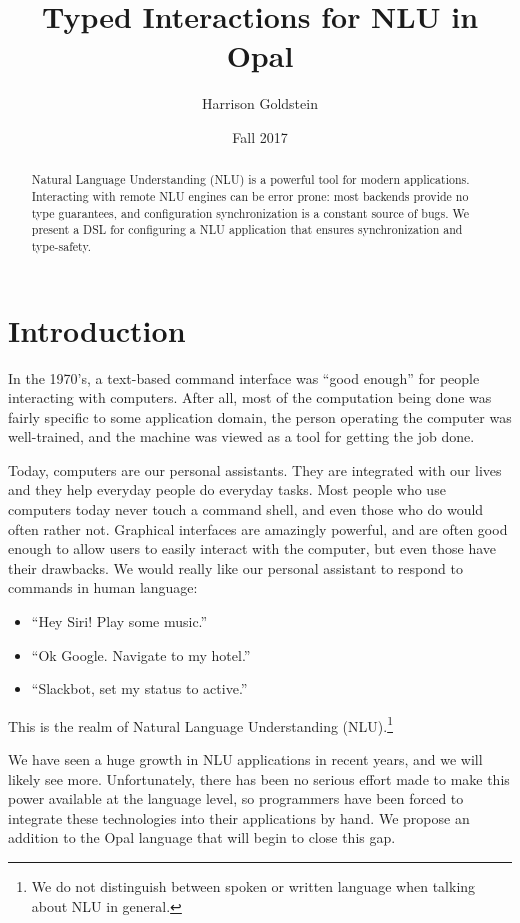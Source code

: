 \documentclass[twocolumn]{article}
\title{Typed Interactions for NLU in Opal}
\author{Harrison Goldstein}
\date{Fall 2017}
\begin{document}
\maketitle

\begin{abstract}
  Natural Language Understanding (NLU) is a powerful tool for modern
  applications. Interacting with remote NLU engines can be error prone: most
  backends provide no type guarantees, and configuration synchronization is a
  constant source of bugs. We present a DSL for configuring a NLU application
  that ensures synchronization and type-safety.
\end{abstract}

\section{Introduction} \label{introduction}
In the 1970's, a text-based command interface was ``good enough'' for people
interacting with computers. After all, most of the computation being done was
fairly specific to some application domain, the person operating the computer
was well-trained, and the machine was viewed as a tool for getting the job done.

Today, computers are our personal assistants. They are integrated with our lives
and they help everyday people do everyday tasks. Most people who use computers
today never touch a command shell, and even those who do would often rather not.
Graphical interfaces are amazingly powerful, and are often good enough to allow
users to easily interact with the computer, but even those have their drawbacks.
We would really like our personal assistant to respond to commands in human
language:
\begin{itemize}
\item ``Hey Siri! Play some music.''
\item ``Ok Google. Navigate to my hotel.''
\item ``Slackbot, set my status to active.''
\end{itemize}
This is the realm of Natural Language Understanding (NLU).\footnote{We do not
  distinguish between spoken or written language when talking about NLU in
  general.}

We have seen a huge growth in NLU applications in recent years, and we will
likely see more. Unfortunately, there has been no serious effort made to make
this power available at the language level, so programmers have been forced to
integrate these technologies into their applications by hand. We propose an
addition to the Opal language that will begin to close this gap.
\end{document}
